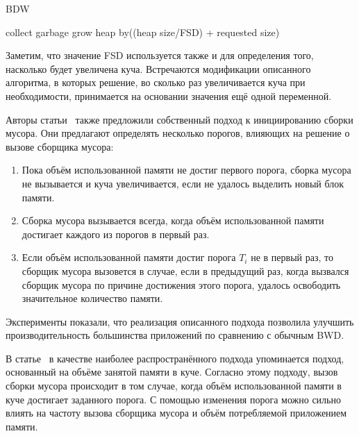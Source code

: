 \documentclass[14pt]{extarticle}
\begin{document}
\begin{algorithm}[hbt]
\caption{BDW}
\label{BDW-algo}
\begin{algorithmic}[1]
        \State collect garbage
    \Else 
        \State grow heap by((heap size/FSD) + requested size)
    \EndIf
\EndIf
\end{algorithmic}
\end{algorithm}

Заметим, что значение FSD используется также и для определения того, насколько будет увеличена куча.
Встречаются модификации описанного алгоритма, в которых решение, во сколько раз увеличивается куча
при необходимости, принимается на основании значения ещё одной переменной.

Авторы статьи~\cite{BDW} также предложили собственный подход к инициированию сборки мусора.
Они предлагают определять несколько порогов, влияющих на решение о вызове сборщика мусора:
\begin{enumerate}
\item{Пока объём использованной памяти не достиг первого порога, сборка мусора не вызывается и куча
увеличивается, если не удалось выделить новый блок памяти.}
\item{Сборка мусора вызывается всегда, когда объём использованной памяти достигает каждого из
порогов в первый раз.}
\item{Если объём использованной памяти достиг порога $T_i$ не в первый раз, то сборщик мусора
вызовется в случае, если в предыдущий раз, когда вызвался сборщик мусора по причине
достижения этого порога, удалось освободить
значительное количество памяти.}

\end{enumerate}


Эксперименты показали, что реализация описанного подхода позволила улучшить производительность 
большинства приложений по сравнению с обычным BWD.


В статье~\cite{microphase} в качестве наиболее распространённого подхода упоминается 
подход, основанный на объёме занятой памяти в куче.
Согласно этому подходу, вызов сборки мусора происходит в том случае,
когда объём использованной памяти в куче достигает заданного порога. С помощью
изменения порога можно сильно влиять на частоту вызова сборщика мусора и объём потребляемой приложением
памяти.
\end{document}
